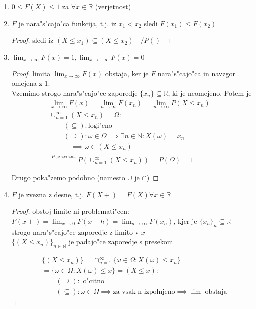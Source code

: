 \documentclass[a4paper,12pt]{article}
\theoremstyle{definition}
\theoremstyle{remark}
\newcommand{\N}{\mathbb{N}}
\newcommand{\R}{\mathbb{R}}
\begin{document}
\begin{enumerate}
    \item $0 \leq F(X) \leq 1$ za $\forall x \in \R$ (verjetnost)
    \item $F$ je nara"s"cajo"ca funkcija, t.j. iz $x_1 < x_2$ sledi $F(x_1) \leq F(x_2)$
        \begin{proof}
            sledi iz $(X \leq x_1) \subseteq (X \leq x_2) \quad / P()$
        \end{proof}
    \item $\lim_{x \to \infty} F(x) = 1, \lim_{x \to -\infty} F(x) = 0$
        \begin{proof}
            limita $\lim_{x \to \infty} F(x)$ obstaja, ker je $F$ nara"s"cajo"ca in navzgor omejena z 1. \\
            Vzemimo strogo nara"s"cajo"ce zaporedje $\{x_n\} \subseteq \R$, ki je neomejeno. Potem je
            \begin{align*}
                &\lim_{x \to \infty} F(x) = \lim_{n \to \infty} F(x_n) = \lim_{n \to \infty} P(X \leq x_n) = \\
                &\cup_{n = 1}^{\infty} (X \leq x_n) = \Omega: \\
                &\qquad (\subseteq): \text{logi"cno} \\
                &\qquad (\supseteq): \omega \in \Omega \implies \exists n \in \N: X(\omega) = x_n \\
                &\qquad \quad \implies \omega \in (X \leq x_n) \\
                &\stackrel{P \text{ je zvezna}}{=} P(\cup_{n=1}^{\infty} (X \leq x_n)) = P(\Omega) = 1
            \end{align*}

            Drugo poka"zemo podobno (namesto $\cup$ je $\cap$)
        \end{proof}
    \item $F$ je zvezna z desne, t.j. $F(X+) = F(X) \forall x \in \R$
        \begin{proof}
            obstoj limite ni problemati"cen: $F(x+) = \lim_{x \to 0} F(x+h) = \lim_{n \to \infty} F(x_n)$, kjer
            je $\{x_n\}_n \subseteq \R$ strogo nara"s"cajo"ce zaporedje z limito v $x$ \\
            $\{(X \leq x_n)\}_{n \in \N}$ je padajo"ce zaporedje s presekom

            \begin{align*}
                &\{(X \leq x_n)\} = \cap_{n=1}^{\infty} \{\omega \in \Omega: X(\omega) \leq x_n\} = \\
                &= \{\omega \in \Omega: X(\omega) \leq x\} = (X \leq x): \\
                &\qquad (\supseteq): \text{ o"citno} \\
                &\qquad (\subseteq): \omega \in \Omega \implies \text{za vsak n izpolnjeno} \implies    
                    \lim \text{ obstaja}
            \end{align*}


\end{proof}
\end{enumerate}
\end{document}
